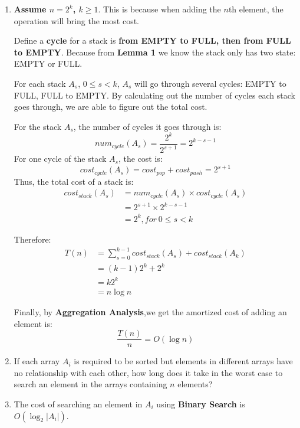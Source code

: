 \documentclass[12pt,a4paper]{article}
\makeatletter
\newtheorem*{solution}{Solution}
\theoremstyle{definition}
\renewenvironment{solution}[1][Solution] {\par\pushQED{\qed}\normalfont\topsep6\p@\@plus6\p@\relax\trivlist\item[\hskip\labelsep\bfseries#1\@addpunct{.}]\ignorespaces}{\popQED\endtrivlist\@endpefalse} \makeatother
\makeatother
\begin{document}
\begin{enumerate}
\begin{enumerate}
\begin{solution}
        \textbf{Assume $n=2^k$, $k\geq 1$}. This is because when adding the $n$th element, the operation will bring the most cost.
        
        Define a \textbf{cycle} for a stack is \textbf{from EMPTY to FULL, then from FULL to EMPTY}. Because from \textbf{Lemma 1} we know the stack only has two state: EMPTY or FULL.
        
        For each stack $A_s$, $0\leq s < k$, $A_s$ will go through several cycles: EMPTY to FULL, FULL to EMPTY. By calculating out the number of cycles each stack goes through, we are able to figure out the total cost.

        
        For the stack $A_s$, the number of cycles it goes through is:
        $$
        num_{cycle}(A_s) = \frac{2^k}{2^{s+1}}=2^{k-s-1}
        $$
        For one cycle of the stack $A_s$, the cost is:
        $$
        cost_{cycle}(A_s)=cost_{pop} + cost_{push} = 2^{s+1}
        $$
        Thus, the total cost of a stack is:
        $$
         \begin{aligned}
        cost_{stack}(A_s)
         &= num_{cycle}(A_s)\times cost_{cycle}(A_s)\\
         &=2^{s+1} \times 2^{k-s-1}\\
         &=2^k, for\ 0\leq s <k
         \end{aligned}
        $$
        
        Therefore:
        $$
        \begin{aligned}
        T(n)&=\sum_{s=0}^{k-1} cost_{stack}(A_s) + cost_{stack}(A_{k})\\
        &=(k-1)2^k + 2^k \\
        &= k2^k\\
        &= n\log n
        \end{aligned}
        $$
        
        Finally, by \textbf{Aggregation Analysis},we get the amortized cost of adding an element is:
        $$
        \frac{T(n)}{n} = O(\log n)
        $$
        
        \end{solution}
        \item If each array $A_i$ is required to be sorted but elements in different arrays have no relationship with each other, how long does it take in the worst case to search an element in the arrays containing $n$ elements? 
        \begin{solution}
        The cost of searching an element in $A_i$ using \textbf{Binary Search} is $O(\log_2|A_i|)$.
        

\end{solution}
\end{enumerate}
\end{enumerate}
\end{document}
